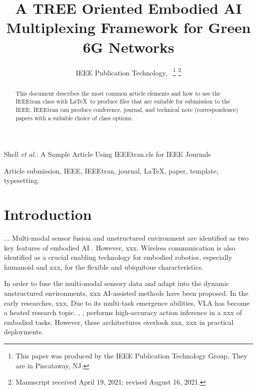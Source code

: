 \documentclass[lettersize,journal]{IEEEtran}
\theoremstyle{custom}
\begin{document}
\title{A TREE Oriented Embodied AI Multiplexing Framework for Green 6G Networks}

\author{IEEE Publication Technology,~
\thanks{This paper was produced by the IEEE Publication Technology Group. They are in Piscataway, NJ.}%
\thanks{Manuscript received April 19, 2021; revised August 16, 2021.}}

%
{Shell \MakeLowercase{\textit{et al.}}: A Sample Article Using IEEEtran.cls for IEEE Journals}


\maketitle

\begin{abstract}
This document describes the most common article elements and how to use the IEEEtran class with \LaTeX \ to produce files that are suitable for submission to the IEEE.  IEEEtran can produce conference, journal, and technical note (correspondence) papers with a suitable choice of class options. 
\end{abstract}

\begin{IEEEkeywords}
Article submission, IEEE, IEEEtran, journal, \LaTeX, paper, template, typesetting.
\end{IEEEkeywords}

\section{Introduction}
...  
Multi-modal sensor fusion and unstructured environment are identified as two key features of embodied AI \cite{li_developments_2025}. However, xxx. 
Wireless communication is also identified as a crucial enabling technology for embodied robotics, especially humanoid and xxx, for the flexible and ubiquitous characteristics. 

In order to fuse the multi-modal sensory data and adapt into the dynamic unstructured environments, xxx AI-assisted methods have been proposed. In the early researches, xxx. Due to its multi-task emergence abilities, VLA has become a heated research topic. \cite{}, \cite{}, \cite{} performs high-accuracy action inference in a xxx of embodied tasks. However, these architectures overlook xxx, xxx in practical deployments. 
\end{document}
